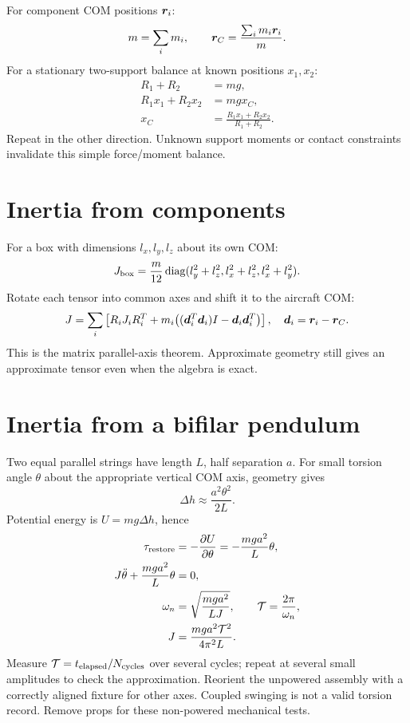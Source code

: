 For component COM positions $\bm{r}_i$:
\begin{equation}
m=\sum_i m_i,\qquad \bm{r}_C=\frac{\sum_i m_i\bm{r}_i}{m}.
\end{equation}
For a stationary two-support balance at known positions $x_1,x_2$:
\begin{align}
R_1+R_2&=mg,\\
R_1x_1+R_2x_2&=mgx_C,\\
x_C&=\frac{R_1x_1+R_2x_2}{R_1+R_2}.
\end{align}
Repeat in the other direction. Unknown support moments or contact constraints
invalidate this simple force/moment balance.

\section{Inertia from components}
For a box with dimensions $l_x,l_y,l_z$ about its own COM:
\begin{equation}
J_{\rm box}=\frac m{12}\operatorname{diag}(l_y^2+l_z^2,l_x^2+l_z^2,l_x^2+l_y^2).
\end{equation}
Rotate each tensor into common axes and shift it to the aircraft COM:
\begin{equation}
J=\sum_i\left[R_iJ_iR_i^T+
m_i\bigl((\bm{d}_i^T\bm{d}_i)I-\bm{d}_i\bm{d}_i^T\bigr)\right],
\quad \bm{d}_i=\bm{r}_i-\bm{r}_C.
\end{equation}
This is the matrix parallel-axis theorem. Approximate geometry still gives an
approximate tensor even when the algebra is exact.

\section{Inertia from a bifilar pendulum}
Two equal parallel strings have length $L$, half separation $a$.
For small torsion angle $\theta$ about the appropriate vertical COM axis,
geometry gives
\begin{equation}
\Delta h\approx\frac{a^2\theta^2}{2L}.
\end{equation}
Potential energy is $U=mg\Delta h$, hence
\begin{align}
\tau_{\rm restore}&=-\frac{\partial U}{\partial\theta}
=-\frac{mga^2}{L}\theta,\\
J\ddot\theta+\frac{mga^2}{L}\theta&=0,\\
\omega_n&=\sqrt{\frac{mga^2}{LJ}},\qquad
\mathcal T=\frac{2\pi}{\omega_n},\\
J&=\frac{mga^2\mathcal T^2}{4\pi^2L}.
\end{align}
Measure $\mathcal T=t_{\rm elapsed}/N_{\rm cycles}$ over several cycles; repeat
at several small amplitudes to check the approximation. Reorient the unpowered
assembly with a correctly aligned fixture for other axes. Coupled swinging is
not a valid torsion record. Remove props for these non-powered mechanical tests.

